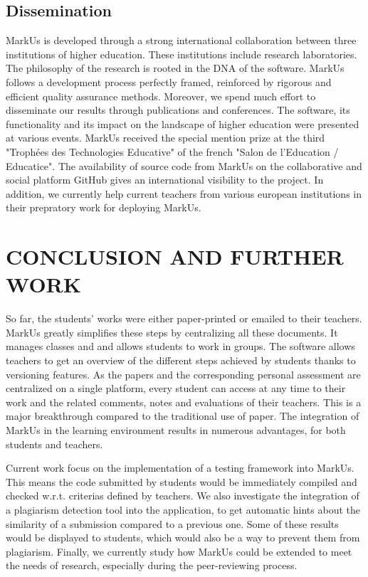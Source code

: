 \documentclass[twocolumn,10pt]{asme2e}
\begin{document}
\subsection*{Dissemination}

MarkUs is developed through a strong international collaboration between three institutions of higher education. These institutions include research laboratories. The philosophy of the research is rooted in the DNA of the software. MarkUs follows a development process perfectly framed, reinforced by rigorous and efficient quality assurance methods. Moreover, we spend much effort to disseminate our results through publications and conferences. The software, its functionality and its impact on the landscape of higher education were presented at various events. MarkUs received the special mention prize at the third "Troph\'{e}es des Technologies Educative" of the french "Salon de l'Education / Educatice". 
The availability of source code from MarkUs on the collaborative and social platform GitHub gives an international visibility to the project. In addition, we currently help current teachers from various european institutions in their prepratory work  for deploying MarkUs.


\section*{CONCLUSION AND FURTHER WORK}

So far, the students' works were either paper-printed or emailed to their teachers. MarkUs greatly simplifies these steps by centralizing all these documents. It manages classes and and allows students to work in groups. The software allows teachers to get an overview of the different steps achieved by students thanks to versioning features. As the papers and the corresponding personal assessment are centralized on a single platform, every student can access at any time to their work and the related comments, notes and evaluations of their teachers. This is a major breakthrough compared to the traditional use of paper. The integration of MarkUs in the learning environment results in numerous advantages, for both students and teachers.

Current work focus on the implementation of a testing framework into MarkUs. This means the code submitted by students would be immediately compiled and checked w.r.t. criterias defined by teachers. We also investigate the integration of a plagiarism detection tool into the application, to get automatic hints about the similarity of a submission compared to a previous one. Some of these results would be displayed to students, which would also be a way to prevent them from plagiarism. Finally, we currently study how MarkUs could be extended to meet the needs of research, especially during the peer-reviewing process. 
\end{document}
